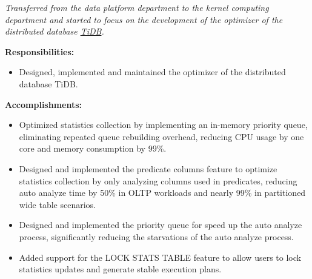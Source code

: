 \documentclass{software_engineer_rustin_liu}
\newcommand{\en}[1]{#1}
\newcommand{\zh}[1]{}
\begin{document}
\en{}
\zh{\datedsubsection{\textbf{\href{https://pingcap.com/zh/}{PingCAP Inc. - 数据库 - 数据库内核研发（Golang/Rust）}}}{2023/08 -- 至今}}
\en{\textsl{Transferred from the data platform department to the kernel computing department and started to focus on the development of the optimizer of the distributed database {\href{https://github.com/pingcap/tidb}{TiDB}}.}}
\zh{\textsl{从数据平台部门转组到计算内核部门，开始专注于分布式数据库 {\href{https://github.com/pingcap/tidb}{TiDB} 优化器的研发。}}}

\en{\textbf{Responsibilities:}}
\zh{\textbf{职责：}}
\begin{itemize}
      \item \en{Designed, implemented and maintained the optimizer of the distributed database TiDB.}
      \zh{设计、实现和维护分布式数据库 TiDB 的优化器。}
\end{itemize}

\en{\textbf{Accomplishments:}}
\zh{\textbf{产出：}}
\begin{itemize}
      \item \en{Optimized statistics collection by implementing an in-memory priority queue, eliminating repeated queue rebuilding overhead, reducing CPU usage by one core and memory consumption by 99\%.}
      \zh{通过实现内存中的优先级队列优化统计信息收集，消除重复队列重建开销，减少一个 CPU 核心使用率并降低 99\% 内存消耗。}
      \item \en{Designed and implemented the predicate columns feature to optimize statistics collection by only analyzing columns used in predicates, reducing auto analyze time by 50\% in OLTP workloads and nearly 99\% in partitioned wide table scenarios.}
      \zh{设计和实现了 predicate columns 功能，通过只分析谓词中使用的列来优化统计信息收集，在 OLTP 工作负载下将自动分析时间减少了 50\%，在分区宽表场景下提升近 99\%。}
      \item \en{Designed and implemented the priority queue for speed up the auto analyze process, significantly reducing the starvations of the auto analyze process.}
      \zh{设计并实现了优先级队列，加速了自动分析过程，极大的减少了自动分析过程的饥饿现象。}
      \item \en{Added support for the LOCK STATS TABLE feature to allow users to lock statistics updates and generate stable execution plans.}
      \zh{添加 LOCK STATS TABLE 功能，方便用户锁定统计信息的更新，生成稳定的执行计划。}
\end{itemize}
\end{document}
